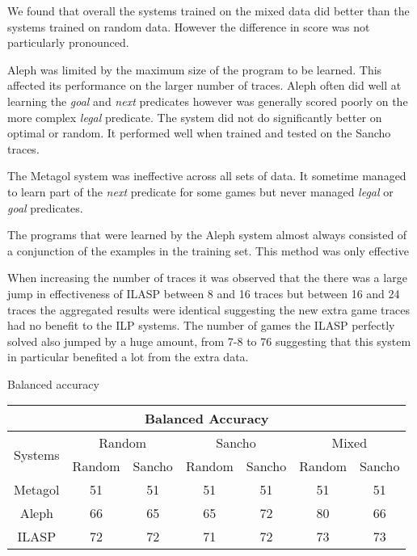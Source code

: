 We found that overall the systems trained on the mixed data did better than the systems trained on random data. However the difference in score was not particularly pronounced.

Aleph was limited by the maximum size of the program to be learned. This affected its performance on the larger number of traces. Aleph often did well at learning the \textit{goal} and \textit{next} predicates however was generally scored poorly on the more complex \textit{legal} predicate. The system did not do significantly better on optimal or random. It performed well when trained and tested on the Sancho traces. 

The Metagol system was ineffective across all sets of data. It sometime managed to learn part of the \textit{next} predicate for some games but never managed \textit{legal} or \textit{goal} predicates.

The programs that were learned by the Aleph system almost always consisted of a conjunction of the examples in the training set. This method was only effective 




When increasing the number of traces it was observed that the there was a large jump in effectiveness of ILASP between 8 and 16 traces but between 16 and 24 traces the aggregated results were identical suggesting the new extra game traces had no benefit to the ILP systems. The number of games the ILASP perfectly solved also jumped by a huge amount, from 7-8 to 76 suggesting that this system in particular benefited a lot from the extra data.

Balanced accuracy

\begin{table}[]
	\begin{tabular}{|c|c|c|c|c|c|c|}
		\hline
		\multicolumn{7}{|c|}{Balanced Accuracy}                                                                           \\ \hline
		\multirow{2}{*}{Systems} & \multicolumn{2}{c|}{Random} & \multicolumn{2}{c|}{Sancho} & \multicolumn{2}{c|}{Mixed} \\ \cline{2-7} 
		& Random       & Sancho       & Random       & Sancho       & Random       & Sancho      \\ \hline
		Metagol                  & 51           & 51           & 51           & 51           & 51           & 51          \\ \hline
		Aleph                    & 66           & 65           & 65           & 72           & 80           & 66          \\ \hline
		ILASP                    & 72           & 72           & 71           & 72           & 73           & 73          \\ \hline
	\end{tabular}
\end{table}


